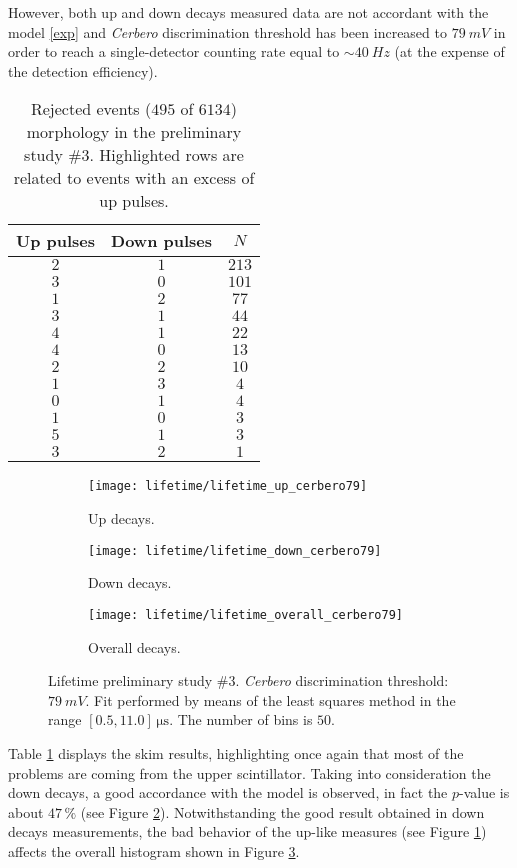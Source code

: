 However, both up and down decays measured data are not accordant with the model \eqref{exp} and \emph{Cerbero} discrimination threshold has been increased to $\SI{79}{mV}$ in order to reach a single-detector counting rate equal to $\sim\SI{40}{Hz}$ (at the expense of the detection efficiency).
\begin{table}[!htp]
	\centering
	\begin{tabular}{ccc}
		\toprule
		Up pulses & Down pulses & $N$\\
		\midrule
		\rowcolor{blue!25}$2$&$1$&$213$ \\
		\rowcolor{blue!25}$3$&$0$&$101$ \\
		$1$&$2$&$77$ \\
		\rowcolor{blue!25}$3$&$1$&$44$ \\
		\rowcolor{blue!25}$4$&$1$&$22$ \\
		\rowcolor{blue!25}$4$&$0$&$13$ \\
		\rowcolor{blue!25}$2$&$2$&$10$\\
		$1$&$3$&$4$\\
		$0$&$1$&$4$\\
		$1$&$0$&$3$\\
		\rowcolor{blue!25}$5$&$1$&$3$\\
		\rowcolor{blue!25}$3$&$2$&$1$\\
		\bottomrule		
	\end{tabular}
	\caption{Rejected events ($495$ of $6134$) morphology in the preliminary study \#3. Highlighted rows are related to events with an excess of up pulses.}\label{tab:skim3}
\end{table}
\begin{figure}[!htp]
	\centering
	\begin{subfigure}{.5\linewidth}
		\centering
		\texttt{[image: lifetime/lifetime\_up\_cerbero79]}
		\caption{Up decays.}\label{subfig:lt3up}
	\end{subfigure}\hfill
	\begin{subfigure}{.5\linewidth}
		\centering
		\texttt{[image: lifetime/lifetime\_down\_cerbero79]}
		\caption{Down decays.}\label{subfig:lt3down}
	\end{subfigure}
	\begin{subfigure}{.5\linewidth}
		\centering
		\texttt{[image: lifetime/lifetime\_overall\_cerbero79]}
		\caption{Overall decays.}\label{subfig:lt3}
	\end{subfigure}
	\caption{Lifetime preliminary study \#3. \emph{Cerbero} discrimination threshold: $\SI{79}{mV}$. Fit performed by means of the least squares method in the range $[0.5, 11.0]\, \si{\micro \second}$. The number of bins is $50$.}\label{fig:lt3}
\end{figure}
Table \ref{tab:skim3} displays the skim results, highlighting once again that most of the problems are coming from the upper scintillator. Taking into consideration the down decays, a good accordance with the model is observed, in fact the $p$-value is about $47\,\%$ (see Figure \ref{subfig:lt3down}). Notwithstanding the good result obtained in down decays measurements, the bad behavior of the up-like measures (see Figure \ref{subfig:lt3up}) affects the overall histogram shown in Figure \ref{subfig:lt3}.\\

